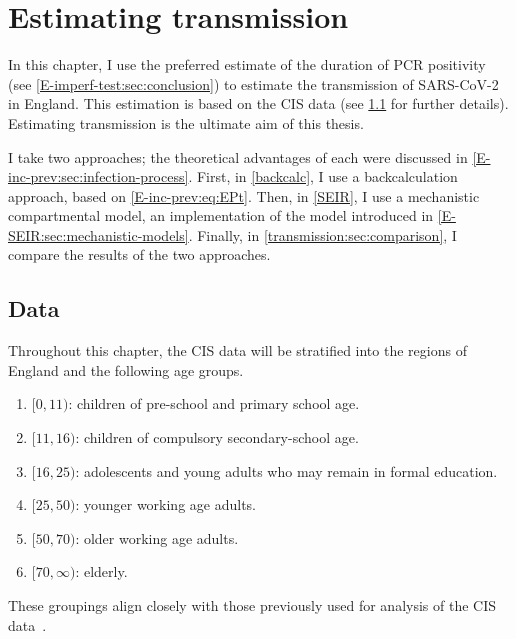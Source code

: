 \documentclass[thesis.tex]{subfiles}
\begin{document}
\ifSubfilesClassLoaded{
    \setcounter{chapter}{6}
}

\chapter{Estimating transmission} \label{transmission}


In this chapter, I use the preferred estimate of the duration of PCR positivity (see \cref{E-imperf-test:sec:conclusion}) to estimate the transmission of SARS-CoV-2 in England.
This estimation is based on the CIS data (see \cref{transmission:sec:data} for further details).
Estimating transmission is the ultimate aim of this thesis.

I take two approaches; the theoretical advantages of each were discussed in \cref{E-inc-prev:sec:infection-process}.
First, in \cref{backcalc}, I use a backcalculation approach, based on \cref{E-inc-prev:eq:EPt}.
Then, in \cref{SEIR}, I use a mechanistic compartmental model, an implementation of the model introduced in \cref{E-SEIR:sec:mechanistic-models}.
Finally, in \cref{transmission:sec:comparison}, I compare the results of the two approaches.

\section{Data} \label{transmission:sec:data}


Throughout this chapter, the CIS data will be stratified into the regions of England and the following age groups.
\begin{enumerate}
    \item $[0, 11)$: children of pre-school and primary school age.
    \item $[11, 16)$: children of compulsory secondary-school age.
    \item $[16, 25)$: adolescents and young adults who may remain in formal education.
    \item $[25, 50)$: younger working age adults.
    \item $[50, 70)$: older working age adults.
    \item $[70, \infty)$: elderly.
\end{enumerate}
These groupings align closely with those previously used for analysis of the CIS data~\autocites[e.g.:][]{houseInferring}{walkerTracking}.
\end{document}
